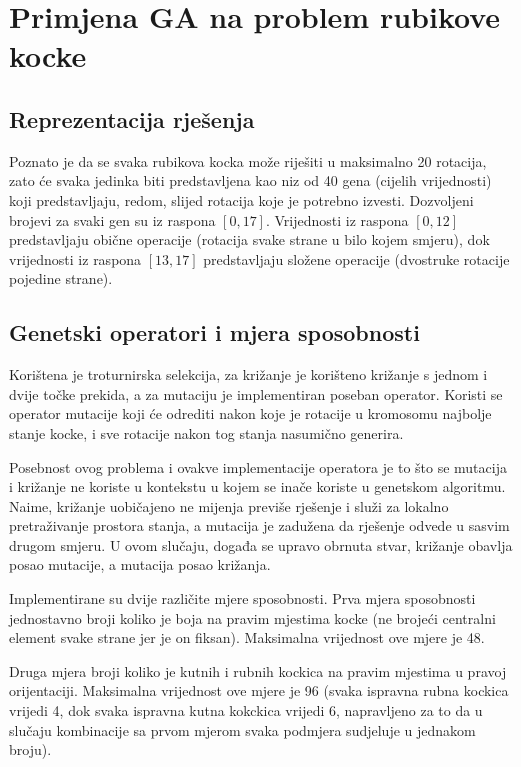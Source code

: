 \documentclass[times, utf8, seminar, numeric]{fer}
\begin{document}
\section{Primjena GA na problem rubikove kocke}

\subsection{Reprezentacija rješenja}
Poznato je da se svaka rubikova kocka može riješiti u maksimalno 20 rotacija, zato će svaka jedinka biti predstavljena kao niz od 40 gena (cijelih vrijednosti) koji predstavljaju, redom, slijed rotacija koje je potrebno izvesti. Dozvoljeni brojevi za svaki gen su iz raspona $[0, 17]$.
Vrijednosti iz raspona $[0, 12]$ predstavljaju obične operacije (rotacija svake strane u bilo kojem smjeru), dok vrijednosti iz raspona $[13, 17]$ predstavljaju složene operacije (dvostruke rotacije pojedine strane).


\subsection{Genetski operatori i mjera sposobnosti}
Korištena je troturnirska selekcija, za križanje je korišteno križanje s jednom i dvije točke prekida, a za mutaciju je implementiran poseban operator.
Koristi se operator mutacije koji će odrediti nakon koje je rotacije u kromosomu najbolje stanje kocke, i sve rotacije nakon tog stanja nasumično generira.

Posebnost ovog problema i ovakve implementacije operatora je to što se mutacija i križanje ne koriste u kontekstu u kojem se inače koriste u genetskom algoritmu. Naime, križanje uobičajeno ne mijenja previše rješenje i služi za lokalno pretraživanje prostora stanja, a mutacija je zadužena da rješenje odvede u sasvim drugom smjeru. U ovom slučaju, događa se upravo obrnuta stvar, križanje obavlja posao mutacije, a mutacija posao križanja.

Implementirane su dvije različite mjere sposobnosti. 
Prva mjera sposobnosti jednostavno broji koliko je boja na pravim mjestima kocke (ne brojeći centralni element svake strane jer je on fiksan). Maksimalna vrijednost ove mjere je 48.

Druga mjera broji koliko je kutnih i rubnih kockica na pravim mjestima u pravoj orijentaciji. Maksimalna vrijednost ove mjere je 96 (svaka ispravna rubna kockica vrijedi 4, dok svaka ispravna kutna kokckica vrijedi 6, napravljeno za to da u slučaju kombinacije sa prvom mjerom svaka podmjera sudjeluje u jednakom broju).
\end{document}
